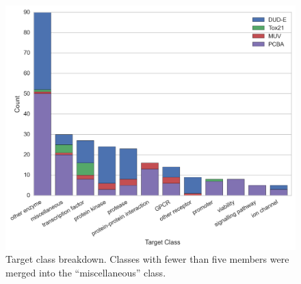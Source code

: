 \begin{figure}[ht]
\centering
\includegraphics[width=\linewidth]{Images/target_bar.png}
\caption{Target class breakdown. Classes with fewer than five members were
  merged into the ``miscellaneous'' class.}
\label{fig:target_bar}
\end{figure}

